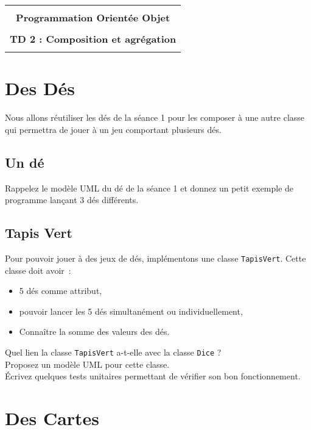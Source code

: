 \documentclass[12pt]{article}
\begin{document}
    \begin{center}
      \begin{tabular}{c}
      \hline
    \\
        {\bf \textsf {\Large Programmation Orientée Objet}}\\
    \\
        {\bf \textsf {\Large TD 2 : Composition et agrégation}}\\
    \\
        \hline
      \end{tabular}
    \end{center}
    \vspace{15mm}

\section{Des Dés}

Nous allons réutiliser les dés de la séance 1 pour les composer à une autre classe qui permettra de jouer à un jeu comportant plusieurs dés.

\subsection{Un dé}

Rappelez le modèle UML du dé de la séance 1 et donnez un petit exemple de programme lançant 3 dés différents.


\subsection{Tapis Vert}

Pour pouvoir jouer à des jeux de dés, implémentons une classe
\verb|TapisVert|. Cette classe doit avoir~:
\begin{itemize}
	\item 5 dés comme attribut,
	\item pouvoir lancer les 5 dés simultanément ou individuellement,
	\item Connaître la somme des valeurs des dés.
\end{itemize}

Quel lien la classe \verb|TapisVert| a-t-elle avec la classe \verb|Dice| ?\\
Proposez un modèle UML pour cette classe.\\
Écrivez quelques tests unitaires permettant de vérifier son bon fonctionnement.\\

\section{Des Cartes}
\end{document}
